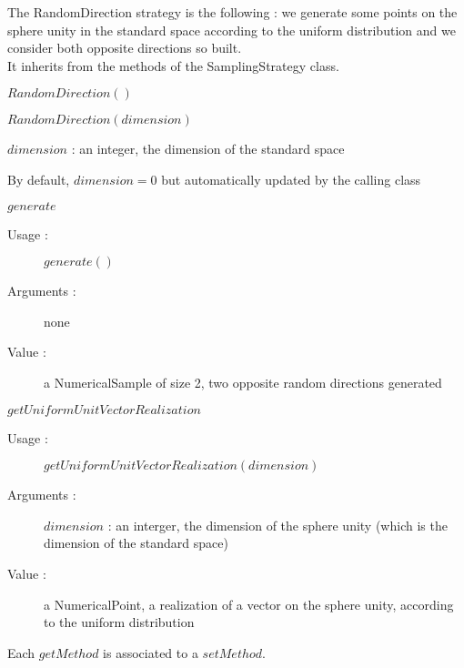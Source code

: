 The RandomDirection strategy is the following : we generate some points on the sphere unity in the standard space according to the uniform distribution and we consider both opposite directions so built.\\


It inherits from the methods of the SamplingStrategy class.

\begin{description}
\item[Usage :] \rule{0pt}{1em}
  \begin{description}
  \item $RandomDirection()$
  \item $RandomDirection(dimension)$
  \end{description}

\item[Arguments :]  \rule{0pt}{1em}
  \begin{description}
  \item $dimension$ : an integer, the dimension of the standard space
  \item By default, $dimension = 0$ but automatically updated by the calling class
  \end{description}
\item[Some methods :]  \rule{0pt}{1em}

  \begin{description}
  \item $generate$
    \begin{description}
    \item[Usage :] $generate()$
    \item[Arguments :] none
    \item[Value :] a NumericalSample of size 2, two opposite random directions generated
    \end{description}
    \bigskip
  \item $getUniformUnitVectorRealization$
    \begin{description}
    \item[Usage :] $getUniformUnitVectorRealization(dimension)$
    \item[Arguments :] $dimension$ : an interger, the dimension of the sphere unity (which is the dimension of the standard space)
    \item[Value :] a NumericalPoint, a realization of a vector on the sphere unity, according to the uniform distribution
    \end{description}
  \end{description}

  Each $getMethod$  is associated to a $setMethod$.

\end{description}

